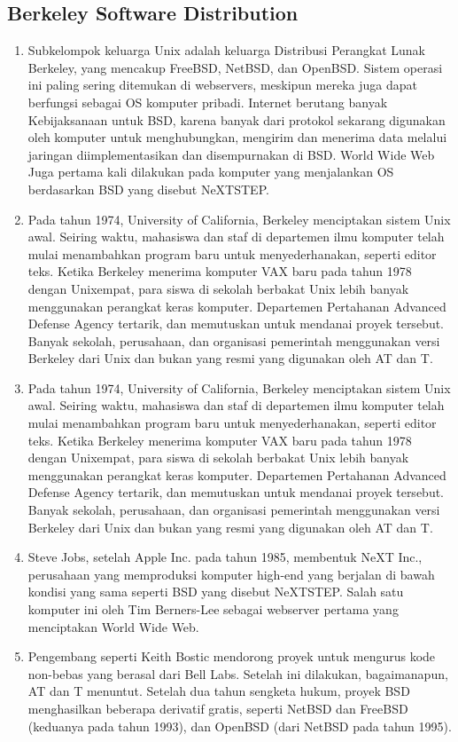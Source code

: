 \subsection{Berkeley Software Distribution}
	\begin{enumerate}
		\item Subkelompok keluarga Unix adalah keluarga Distribusi Perangkat Lunak Berkeley, yang mencakup FreeBSD, NetBSD, dan OpenBSD. Sistem operasi ini paling sering ditemukan di webservers, meskipun mereka juga dapat berfungsi sebagai OS komputer pribadi. Internet berutang banyak Kebijaksanaan untuk BSD, karena banyak dari protokol sekarang digunakan oleh komputer untuk menghubungkan, mengirim dan menerima data melalui jaringan diimplementasikan dan disempurnakan di BSD. World Wide Web Juga pertama kali dilakukan pada komputer yang menjalankan OS berdasarkan BSD yang disebut NeXTSTEP.

		\item Pada tahun 1974, University of California, Berkeley menciptakan sistem Unix awal. Seiring waktu, mahasiswa dan staf di departemen ilmu komputer telah mulai menambahkan program baru untuk menyederhanakan, seperti editor teks. Ketika Berkeley menerima komputer VAX baru pada tahun 1978 dengan Unixempat, para siswa di sekolah berbakat Unix lebih banyak menggunakan perangkat keras komputer. Departemen Pertahanan Advanced Defense Agency tertarik, dan memutuskan untuk mendanai proyek tersebut. Banyak sekolah, perusahaan, dan organisasi pemerintah menggunakan versi Berkeley dari Unix dan bukan yang resmi yang digunakan oleh AT dan T.

		\item Pada tahun 1974, University of California, Berkeley menciptakan sistem Unix awal. Seiring waktu, mahasiswa dan staf di departemen ilmu komputer telah mulai menambahkan program baru untuk menyederhanakan, seperti editor teks. Ketika Berkeley menerima komputer VAX baru pada tahun 1978 dengan Unixempat, para siswa di sekolah berbakat Unix lebih banyak menggunakan perangkat keras komputer. Departemen Pertahanan Advanced Defense Agency tertarik, dan memutuskan untuk mendanai proyek tersebut. Banyak sekolah, perusahaan, dan organisasi pemerintah menggunakan versi Berkeley dari Unix dan bukan yang resmi yang digunakan oleh AT dan T.

		\item Steve Jobs, setelah Apple Inc. pada tahun 1985, membentuk NeXT Inc., perusahaan yang memproduksi komputer high-end yang berjalan di bawah kondisi yang sama seperti BSD yang disebut NeXTSTEP. Salah satu komputer ini oleh Tim Berners-Lee sebagai webserver pertama yang menciptakan World Wide Web.
		\item Pengembang seperti Keith Bostic mendorong proyek untuk mengurus kode non-bebas yang berasal dari Bell Labs. Setelah ini dilakukan, bagaimanapun, AT dan T menuntut. Setelah dua tahun sengketa hukum, proyek BSD menghasilkan beberapa derivatif gratis, seperti NetBSD dan FreeBSD (keduanya pada tahun 1993), dan OpenBSD (dari NetBSD pada tahun 1995).
	\end{enumerate}
